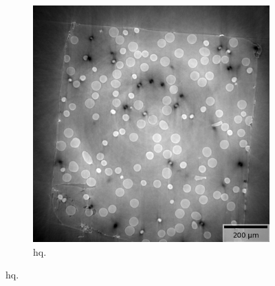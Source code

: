 \begin{figure}
  \begin{subfigure}[t]{\textwidth}
    \centering
    \includegraphics[width=.45\textwidth]{figures/gt32.png}
    \caption{\acrlong{hq}. }
  \end{subfigure}

  \medskip


\end{figure}
